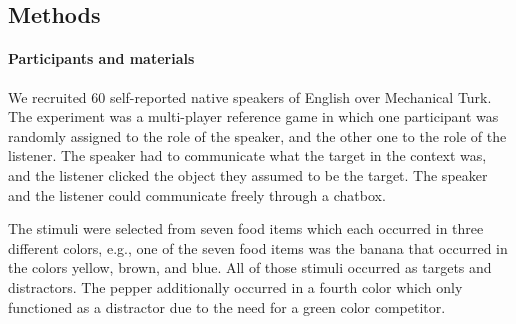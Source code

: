 \documentclass[10pt,letterpaper]{article}
\begin{document}
\subsection{Methods}

\paragraph{Participants and materials}
We recruited 60 self-reported native speakers of English over Mechanical Turk. The experiment was a multi-player reference game in which one participant was randomly assigned to the role of the speaker, and the other one to the role of the listener. The speaker had to communicate what the target in the context was, and the listener clicked the object they assumed to be the target. The speaker and the listener could communicate freely through a chatbox.

The stimuli were selected from seven food items which each occurred in three different colors, e.g., one of the seven food items was the banana that occurred in the colors yellow, brown, and blue. All of those stimuli occurred as targets and distractors. The pepper additionally occurred in a fourth color which only functioned as a distractor due to the need for a green color competitor.
\end{document}
